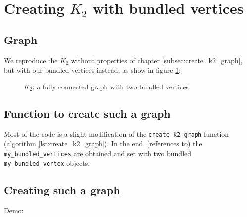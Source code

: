\section{Creating $K_{2}$ with bundled vertices}
\label{subsec:create_bundled_vertices_k2_graph}

\subsection{Graph}

We reproduce the $K_{2}$ without properties of 
chapter \ref{subsec:create_k2_graph}, 
but with our bundled vertices instead, 
as show in figure \ref{fig:bundled_vertices_k2_graph}:

\begin{figure}
  \caption{
    $K_{2}$: a fully connected graph with two bundled vertices
  }
  \label{fig:bundled_vertices_k2_graph}
\end{figure}

\subsection{Function to create such a graph}



Most of the code is a slight modification of the 
\verb;create_k2_graph; function 
(algorithm \ref{lst:create_k2_graph}).
In the end, (references to) the \verb;my_bundled_vertices; 
are obtained and set with two bundled \verb;my_bundled_vertex; objects.

\subsection{Creating such a graph}

Demo:

